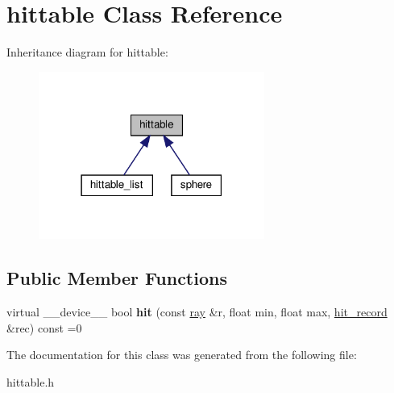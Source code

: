 \hypertarget{classhittable}{}\section{hittable Class Reference}
\label{classhittable}


Inheritance diagram for hittable\+:
\nopagebreak
\begin{figure}[H]
\begin{center}
\leavevmode
\includegraphics[width=210pt]{classhittable__inherit__graph}
\end{center}
\end{figure}
\subsection*{Public Member Functions}
\begin{DoxyCompactItemize}
\item 
\mbox{\label{classhittable_a60a1c185b48041d46539d041a88be150}} 
virtual \+\_\+\+\_\+device\+\_\+\+\_\+ bool {\bfseries hit} (const \hyperlink{classray}{ray} \&r, float min, float max, \hyperlink{structhit__record}{hit\+\_\+record} \&rec) const =0
\end{DoxyCompactItemize}


The documentation for this class was generated from the following file\+:\begin{DoxyCompactItemize}
\item 
hittable.\+h\end{DoxyCompactItemize}
